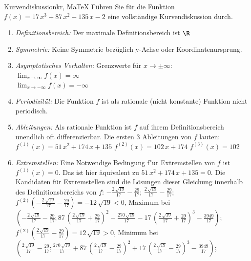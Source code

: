  \providecommand{\MoIl}{(} 
 \providecommand{\MoIr}{)}
 \providecommand{\MIntvlSep}{;} 
 \providecommand{\MElSetSep}{;} 
 \begin{MAufgabe}{Kurvendiskussion}{kr, MaTeX}
 F\"uhren Sie f\"ur die Funktion $f(x)=17\, x^3 + 87\, x^2 + 135\, x - 2$ eine vollst\"andige Kurvendiskussion durch.\\ 
 \ifLsg\Loesung
 \begin{enumerate}
 \item \emph{Definitionsbereich:} 
 Der maximale Definitionsbereich ist $\R$\item \emph{Symmetrie:} 
 Keine Symmetrie bez\"uglich y-Achse oder Koordinatenursprung.\item \emph{Asymptotisches Verhalten:} 
 Grenzwerte f\"ur $x\rightarrow \pm \infty$: \\ 
 $\lim_{x\rightarrow \infty} f(x)=\infty$ \\ 
 $\lim_{x\rightarrow -\infty} f(x)=- \infty$ \\ 
 \item \emph{Periodizit\"at:} 
 Die Funktion $f$ ist als rationale (nicht konstante) Funktion nicht periodisch.\item \emph{Ableitungen:} 
 Als rationale Funktion ist $f$ auf ihrem Definitionsbereich unendlich oft differenzierbar. 
 Die ersten 3 Ableitungen von $f$ lauten: \\ 
 $f^{(1)}(x)=51\, x^2 + 174\, x + 135$\newline 
  $f^{(2)}(x)=102\, x + 174$\newline 
  $f^{(3)}(x)=102$\newline 
  \item \emph{Extremstellen:} 
 Eine Notwendige Bedingung f"ur Extremstellen von $f$ ist $f^{(1)}(x)=0$. 
 Das ist hier \"aquivalent zu $51\, x^2 + 174\, x + 135=0$. 
 Die Kandidaten f\"ur Extremstellen sind die L\"osungen dieser Gleichung innerhalb des Definitionsbereichs von $f$: $ - \frac{2\, \sqrt{19}}{17} - \frac{29}{17}$; $\frac{2\, \sqrt{19}}{17} - \frac{29}{17}$; \\ 
 $f^{(2)}( - \frac{2\, \sqrt{19}}{17} - \frac{29}{17})=- 12\, \sqrt{19}$$<0$, Maximum bei $( - \frac{2\, \sqrt{19}}{17} - \frac{29}{17};87\, {\left(\frac{2\, \sqrt{19}}{17} + \frac{29}{17}\right)}^2 - \frac{270\, \sqrt{19}}{17} - 17\, {\left(\frac{2\, \sqrt{19}}{17} + \frac{29}{17}\right)}^3 - \frac{3949}{17})$; \\ 
 $f^{(2)}(\frac{2\, \sqrt{19}}{17} - \frac{29}{17})=12\, \sqrt{19}$$>0$, Minimum bei $(\frac{2\, \sqrt{19}}{17} - \frac{29}{17};\frac{270\, \sqrt{19}}{17} + 87\, {\left(\frac{2\, \sqrt{19}}{17} - \frac{29}{17}\right)}^2 + 17\, {\left(\frac{2\, \sqrt{19}}{17} - \frac{29}{17}\right)}^3 - \frac{3949}{17})$; \\ 

\end{enumerate}
\end{MAufgabe}
